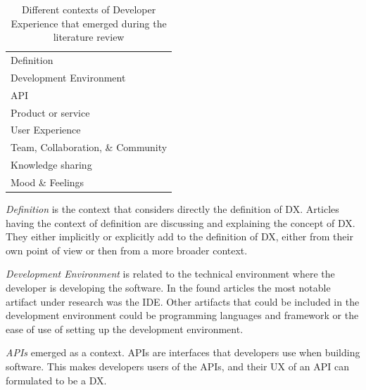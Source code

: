 \documentclass[english, 12pt, a4paper, sci, utf8, a-1b, online]{aaltothesis}
\begin{document}
\begin{table}[ht]
  \begin{center}
    \begin{tabular}{l}
      \hline
      Definition                        \\
      Development Environment           \\
      API                               \\
      Product or service                \\
      User Experience                   \\
      Team, Collaboration, \& Community \\
      Knowledge sharing                 \\
      Mood \& Feelings                  \\
      \hline
    \end{tabular}
    \captionsetup{width=0.6\textwidth}
    \caption{Different contexts of Developer Experience that emerged during the literature review}
    \label{table:contexts}
  \end{center}
\end{table}

\textit{Definition} is the context that considers directly the definition of DX. Articles having the context of definition are discussing and explaining the concept of DX. They either implicitly or explicitly add to the definition of DX, either from their own point of view or then from a more broader context.

\textit{Development Environment} is related to the technical environment where the developer is developing the software. In the found articles the most notable artifact under research was the IDE. Other artifacts that could be included in the development environment could be programming languages and framework or the ease of use of setting up the development environment.

\textit{APIs} emerged as a context. APIs are interfaces that developers use when building software. This makes developers users of the APIs, and their UX of an API can formulated to be a DX.
\end{document}

